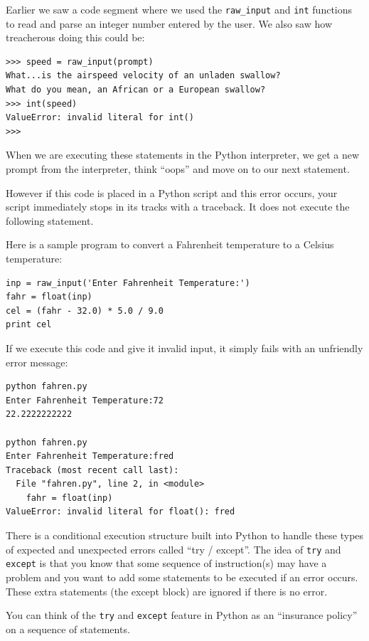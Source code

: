 \documentclass[10pt]{book}
\begin{document}
Earlier we saw a code segment where we used the \verb"raw_input" and
{\tt int} functions to read and parse an integer number entered by
the user.  We also saw how treacherous doing this could be:

\beforeverb
\begin{verbatim}
>>> speed = raw_input(prompt)
What...is the airspeed velocity of an unladen swallow?
What do you mean, an African or a European swallow?
>>> int(speed)
ValueError: invalid literal for int()
>>>
\end{verbatim}
\afterverb
%
When we are executing these statements in the Python interpreter, 
we get a new prompt from the interpreter, think ``oops'' and move 
on to our next statement.  

However if this code is placed in a 
Python script and this error occurs, your script immediately 
stops in its tracks with a traceback.  
It does not execute the following statement. 

Here is a sample program to convert a Fahrenheit temperature 
to a Celsius temperature:

\beforeverb
\begin{verbatim}
inp = raw_input('Enter Fahrenheit Temperature:')
fahr = float(inp)
cel = (fahr - 32.0) * 5.0 / 9.0
print cel
\end{verbatim}
\afterverb
%
If we execute this code and give it invalid input, it simply fails
with an unfriendly error message:

\beforeverb
\begin{verbatim}
python fahren.py 
Enter Fahrenheit Temperature:72
22.2222222222

python fahren.py 
Enter Fahrenheit Temperature:fred
Traceback (most recent call last):
  File "fahren.py", line 2, in <module>
    fahr = float(inp)
ValueError: invalid literal for float(): fred
\end{verbatim}
\afterverb
%
There is a conditional execution structure built into 
Python to handle these types of expected and unexpected
errors called ``try / except''.  The idea of {\tt try}
and {\tt except} is that you know that some sequence
of instruction(s) may have a problem and you want to 
add some statements to be executed if an error occurs.
These extra statements (the except block) are ignored
if there is no error.

You can think of the {\tt try} and {\tt except} feature
in Python as an ``insurance policy'' on a sequence of
statements.
\end{document}

